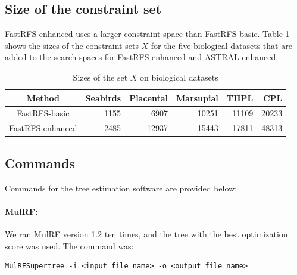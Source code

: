 
\subsection{Size of the constraint set}

FastRFS-enhanced uses a larger constraint space than FastRFS-basic.
Table \ref{tab:set-x} shows the sizes of the constraint sets $X$ for
the five biological datasets that are added to the search spaces for
FastRFS-enhanced and ASTRAL-enhanced.

\begin{table}
  \centering
  \begin{tabular}{c|rrrrr}
    Method             & Seabirds & Placental & Marsupial & THPL & CPL
    \\
    \hline 
    FastRFS-basic      & 1155     & 6907      & 10251     & 11109&
                                                                   20233
    \\
    FastRFS-enhanced      & 2485     & 12937      & 15443     & 17811&
                                                                   48313 \\    
  \end{tabular}
  \caption{Sizes of the set $X$ on biological datasets}
  \label{tab:set-x}
\end{table}



\subsection{Commands}

Commands for the tree estimation software are provided below:

\paragraph{MulRF: }
We ran MulRF version 1.2 ten times,  and the tree with the
best optimization score was used. The command was:
\begin{verbatim}
MulRFSupertree -i <input file name> -o <output file name>
\end{verbatim}

